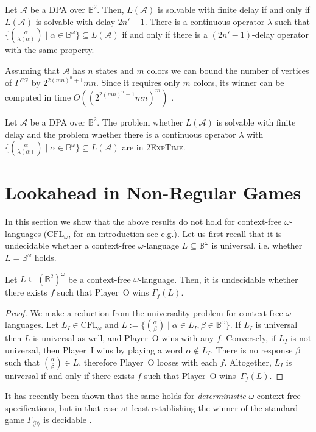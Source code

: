 \documentclass[fleqn,envcountsame]{LMCS}
\newcommand{\aut}[1]{\ensuremath{\mathcal{#1}}}
\newcommand{\pI}{Player~I\xspace}
\newcommand{\pO}{Player~O\xspace}
\newcommand{\GSG}{\ensuremath{\Gamma^{SG}}\xspace}
\newcommand{\Gd}[1]{\ensuremath{\Gamma_{#1}}\xspace}
\newcommand{\GdL}[1]{\ensuremath{\Gamma_{#1}(L)}\xspace}
\newcommand{\LA}{\ensuremath{L(\aut{A})}\xspace}
\newcommand{\const}[1]{\ensuremath{\langle#1\rangle}\xspace}
\newcommand{\Bsq}{\ensuremath{\mathbb{B}^2}\xspace}
\newcommand{\Bom}{\ensuremath{\mathbb{B}^{\omega}}\xspace}
\newcommand{\Bsqom}{\ensuremath{(\mathbb{B}^2)^{\omega}}\xspace}
\newcommand{\al}{\ensuremath{\alpha}\xspace}
\newcommand{\be}{\ensuremath{\beta}\xspace}
\newcommand{\ie}{i.e.\xspace}
\newcommand{\eg}{e.g.\xspace}
\newcommand{\CFLom}{\ensuremath{\mathrm{CFL}_{\omega}}}
\let\obinom\binom
\renewcommand\binom[2]{
  \Big( { {{#1}} \atop {{#2}} } \Big)
}
\begin{document}
\begin{thm}\label{thm:main}
Let \aut{A} be a DPA over \Bsq. Then, \LA is solvable with finite delay
if and only if \LA is solvable with delay $2n'-1$.
There is a continuous operator $\lambda$ such that
$\{\obinom{\al}{\lambda(\al)}\mid\al \in \Bom\} \subseteq L(\aut{A})$
if and only if there is a $(2n'-1)$-delay operator with the same property.
\end{thm}

Assuming that \aut{A} has $n$ states and $m$ colors
we can bound the number of vertices of \GSG by $2^{2(mn)^n+1}mn$.
Since it requires only $m$ colors,
its winner can be computed in time $O((2^{2(mn)^n+1}mn)^m)$ \cite{Sch07ParGameBigSteps}.

\begin{cor}\label{cor:decide_bounded_delay}
Let \aut{A} be a DPA over \Bsq. The problem
whether \LA is solvable with finite delay
and the problem whether there is a continuous operator $\lambda$ with
$\{\obinom{\al}{\lambda(\alpha)}\mid \alpha \in \Bom\} \subseteq \LA$
are in $2$\textsc{ExpTime}.
\end{cor}



\section{Lookahead in Non-Regular Games}\label{sec:pusdown_games_delay}

In this section we show that the above results do not hold for context-free
$\omega$-languages (\CFLom, for an introduction see \eg \cite{CG78OmegaComputDetPushMach}).
Let us first recall that it is undecidable whether a context-free
$\omega$-language $L\subseteq\Bom$ is universal, \ie whether $L=\Bom$ holds.

\begin{thm}\label{thm:finkel_context_free_gale_stewart_undecidable}
Let $L\subseteq\Bsqom$ be a context-free $\omega$-language.
Then, it is undecidable whether there exists $f$ such that \pO wins \GdL{f}.
\end{thm}
\begin{proof}
We make a reduction from the universality problem for context-free $\omega$-languages.
Let $L_I\in\CFLom$ and $L:=\big\{\obinom{\al}{\be} \mid \al\in L_I, \beta\in \Bom \big\}$.
If $L_I$ is universal then $L$ is universal as well, and \pO wins
with any $f$.
Conversely, if $L_I$ is not universal, then \pI wins by playing a word $\al\notin L_I$.
There is no response \be such that $\obinom{\al}{\be}\in L$, therefore
\pO looses with each $f$.
Altogether, $L_I$ is universal if and only if
there exists $f$ such that \pO wins~\GdL{f}.
\end{proof}
It has recently been shown \cite{FLZ11} that the same holds for
\emph{deterministic} $\omega$-context-free specifications, but in that
case at least establishing the winner of the standard game \Gd{\const{0}}
is decidable \cite{Wal96PushProc}.
\end{document}
